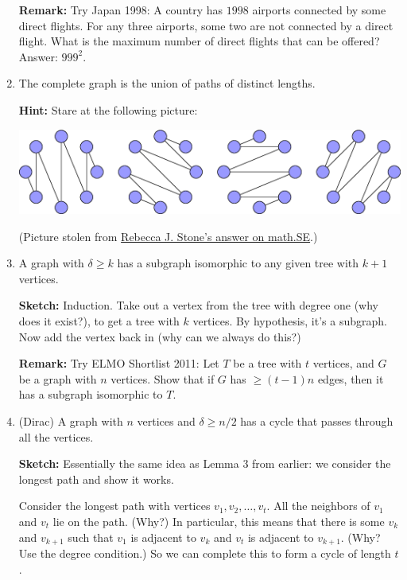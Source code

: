 \documentclass[11pt,paper=letter]{scrartcl}
\begin{document}
\begin{enumerate}
  \textbf{Remark:} Try Japan 1998: A country has $1998$ airports connected by some direct flights. For any three airports, some two are not connected by a direct flight. What is the maximum number of direct flights that can be offered? Answer: $999^2$.

  \item The complete graph is the union of paths of distinct lengths.

  \textbf{Hint:} Stare at the following picture:
  \begin{center}
    \includegraphics[width=6in]{1.png}
  \end{center}

  (Picture stolen from \href{https://math.stackexchange.com/questions/2130583/partition-edges-of-complete-graph-into-paths-of-distinct-length}{Rebecca J. Stone's answer on math.SE}.)

  \item A graph with $\delta \geq k$ has a subgraph isomorphic to any given tree with $k+1$ vertices.

  \textbf{Sketch:} Induction. Take out a vertex from the tree with degree one (why does it exist?), to get a tree with $k$ vertices. By hypothesis, it's a subgraph. Now add the vertex back in (why can we always do this?)

  \textbf{Remark:} Try ELMO Shortlist 2011: Let $T$ be a tree with $t$ vertices, and $G$ be a graph with $n$ vertices. Show that if $G$ has $\geq (t-1)n$ edges, then it has a subgraph isomorphic to $T$.

  \item (Dirac) A graph with $n$ vertices and $\delta \geq n/2$ has a cycle that passes through all the vertices.

  \textbf{Sketch:} Essentially the same idea as Lemma 3 from earlier: we consider the longest path and show it works.

  Consider the longest path with vertices $v_1, v_2, \ldots, v_t$. All the neighbors of $v_1$ and $v_t$ lie on the path. (Why?) In particular, this means that there is some $v_k$ and $v_{k+1}$ such that $v_1$ is adjacent to $v_k$ and $v_t$ is adjacent to $v_{k+1}$. (Why? Use the degree condition.) So we can complete this to form a cycle of length $t$.


\end{enumerate}
\end{document}
